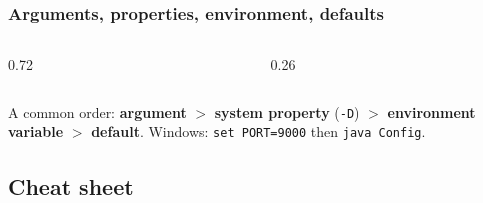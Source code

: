 \documentclass[aspectratio=169,10pt,compress]{beamer}
\begin{document}
\begin{frame}[t,fragile] \frametitle{Arguments, properties, environment, defaults}
  \begin{columns}[T]
    \begin{column}{0.72\textwidth}
    \end{column}
    \begin{column}{0.26\textwidth}
    \end{column}
  \end{columns}

  \vspace{0.2em}
  \small A common order: \textbf{argument} $>$ \textbf{system property} (\texttt{-D}) $>$ \textbf{environment variable} $>$
  \textbf{default}. Windows: \texttt{set PORT=9000} then \texttt{java Config}.
\end{frame}


\subsection[Cheat sheet]{Cheat sheet}
\end{document}
